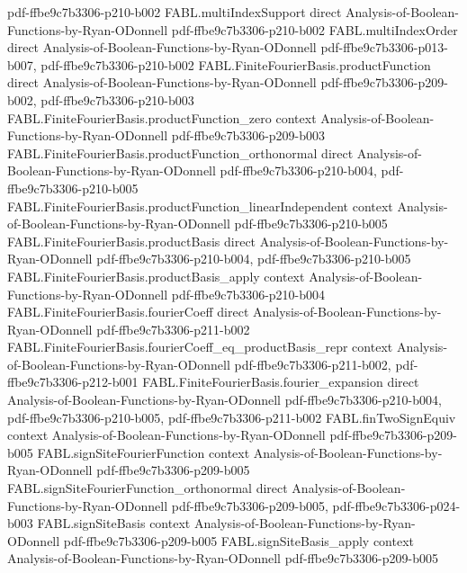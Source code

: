 \begin{theorem}
  {pdf-ffbe9c7b3306-p210-b002}
\proofstep
  {FABL.multiIndexSupport}
  {direct}
  {Analysis-of-Boolean-Functions-by-Ryan-ODonnell}
  {pdf-ffbe9c7b3306-p210-b002}
\proofstep
  {FABL.multiIndexOrder}
  {direct}
  {Analysis-of-Boolean-Functions-by-Ryan-ODonnell}
  {pdf-ffbe9c7b3306-p013-b007,
    pdf-ffbe9c7b3306-p210-b002}
\proofstep
  {FABL.FiniteFourierBasis.productFunction}
  {direct}
  {Analysis-of-Boolean-Functions-by-Ryan-ODonnell}
  {pdf-ffbe9c7b3306-p209-b002,
    pdf-ffbe9c7b3306-p210-b003}
\proofstep
  {FABL.FiniteFourierBasis.productFunction_zero}
  {context}
  {Analysis-of-Boolean-Functions-by-Ryan-ODonnell}
  {pdf-ffbe9c7b3306-p209-b003}
\proofstep
  {FABL.FiniteFourierBasis.productFunction_orthonormal}
  {direct}
  {Analysis-of-Boolean-Functions-by-Ryan-ODonnell}
  {pdf-ffbe9c7b3306-p210-b004,
    pdf-ffbe9c7b3306-p210-b005}
\proofstep
  {FABL.FiniteFourierBasis.productFunction_linearIndependent}
  {context}
  {Analysis-of-Boolean-Functions-by-Ryan-ODonnell}
  {pdf-ffbe9c7b3306-p210-b005}
\proofstep
  {FABL.FiniteFourierBasis.productBasis}
  {direct}
  {Analysis-of-Boolean-Functions-by-Ryan-ODonnell}
  {pdf-ffbe9c7b3306-p210-b004,
    pdf-ffbe9c7b3306-p210-b005}
\proofstep
  {FABL.FiniteFourierBasis.productBasis_apply}
  {context}
  {Analysis-of-Boolean-Functions-by-Ryan-ODonnell}
  {pdf-ffbe9c7b3306-p210-b004}
\proofstep
  {FABL.FiniteFourierBasis.fourierCoeff}
  {direct}
  {Analysis-of-Boolean-Functions-by-Ryan-ODonnell}
  {pdf-ffbe9c7b3306-p211-b002}
\proofstep
  {FABL.FiniteFourierBasis.fourierCoeff_eq_productBasis_repr}
  {context}
  {Analysis-of-Boolean-Functions-by-Ryan-ODonnell}
  {pdf-ffbe9c7b3306-p211-b002,
    pdf-ffbe9c7b3306-p212-b001}
\proofstep
  {FABL.FiniteFourierBasis.fourier_expansion}
  {direct}
  {Analysis-of-Boolean-Functions-by-Ryan-ODonnell}
  {pdf-ffbe9c7b3306-p210-b004,
    pdf-ffbe9c7b3306-p210-b005,
    pdf-ffbe9c7b3306-p211-b002}
\proofstep
  {FABL.finTwoSignEquiv}
  {context}
  {Analysis-of-Boolean-Functions-by-Ryan-ODonnell}
  {pdf-ffbe9c7b3306-p209-b005}
\proofstep
  {FABL.signSiteFourierFunction}
  {context}
  {Analysis-of-Boolean-Functions-by-Ryan-ODonnell}
  {pdf-ffbe9c7b3306-p209-b005}
\proofstep
  {FABL.signSiteFourierFunction_orthonormal}
  {direct}
  {Analysis-of-Boolean-Functions-by-Ryan-ODonnell}
  {pdf-ffbe9c7b3306-p209-b005,
    pdf-ffbe9c7b3306-p024-b003}
\proofstep
  {FABL.signSiteBasis}
  {context}
  {Analysis-of-Boolean-Functions-by-Ryan-ODonnell}
  {pdf-ffbe9c7b3306-p209-b005}
\proofstep
  {FABL.signSiteBasis_apply}
  {context}
  {Analysis-of-Boolean-Functions-by-Ryan-ODonnell}
  {pdf-ffbe9c7b3306-p209-b005}

\end{theorem}
